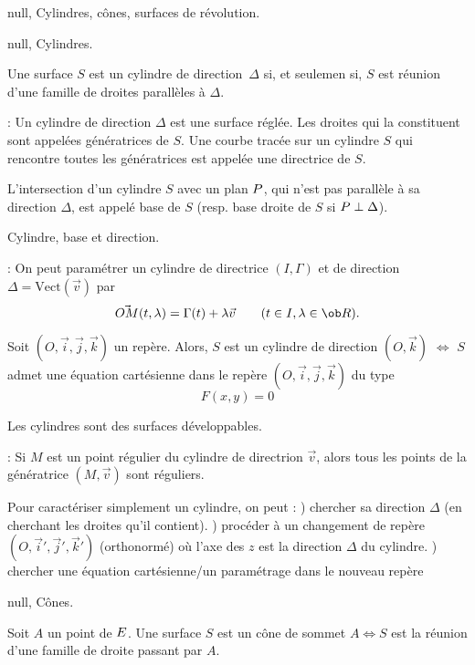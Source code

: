\Section null, Cylindres, cônes, surfaces de révolution.

\Subsection null, Cylindres.

Une surface $S$ est un cylindre de direction~$\Delta$ si, et seulemen si, $S$ 
est réunion d'une famille de droites parallèles à $\Delta$.  
\bigskip

\Remarque : Un cylindre de direction $\Delta$ est une surface réglée. \pn 
Les droites qui la constituent sont appelées génératrices de $S$. \pn
Une courbe tracée sur un cylindre $S$ qui rencontre toutes les génératrices est appelée 
une directrice de $S$. 
\bigskip

\Definition [] L'intersection d'un cylindre $S$ avec un plan $\sc P$, qui n'est pas parallèle 
à sa direction $\Delta$, est appelé base de $S$ 
(resp. base droite de $S$ si $\sc P\perp\Delta$). 

\centerline{%
}%
\Figure [Index=Surfaces!Cylindre]  Cylindre, base et direction.

\Remarque : On peut paramétrer un cylindre de directrice $(I,\Gamma)$ et de direction $\Delta=\mbox{Vect}(\vec v)$ par 
$$
\vec{OM}(t,\lambda)=\Gamma(t)+\lambda\vec v\qquad(t\in I,\lambda\in\ob R).
$$

\Propriete [] Soit $(O,\vec i,\vec j,\vec k)$ un repère. 
Alors, $S$ est un cylindre de direction $(O,\vec k)$ $\Longleftrightarrow$ 
$S$ admet une équation cartésienne dans le repère $(O,\vec i,\vec j,\vec k)$ du type 
$$
F(x,y)=0
$$

\Propriete [] Les cylindres sont des surfaces développables. 
\bigskip

\Remarque : Si $M$ est un point régulier du cylindre de directrion $\vec v$, alors 
tous les points de la génératrice $(M,\vec v)$ sont réguliers. 
\bigskip

\Methode [] Pour caractériser simplement un cylindre, on peut : ) chercher sa direction $\Delta$ (en cherchant les droites qu'il contient). ) procéder à un changement de repère $(O,\vec i',\vec j',\vec k')$ (orthonormé) où l'axe des $z$ 
est la direction $\Delta$ du cylindre. ) chercher une équation cartésienne/un paramétrage dans le nouveau repère
\bigskip\goodbreak

\Subsection null, Cônes.

\Definition [] Soit $A$ un point de $\sc E$. Une surface $S$ est 
un cône de sommet $A\Longleftrightarrow S$ est la réunion 
d'une famille de droite passant par $A$. 
\bigskip


